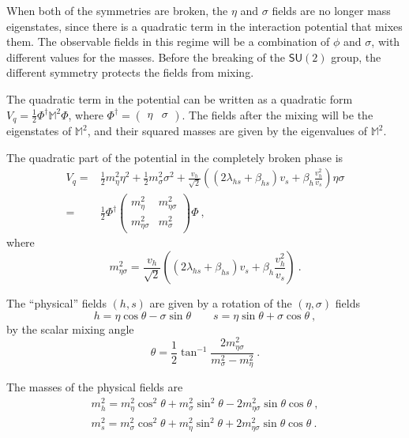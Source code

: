 \documentclass[aps,prd,preprintnumbers,nofootinbibn,twocolumn]{revtex4}
\begin{document}
When both of the symmetries are broken, the $\eta$ and $\sigma$ fields are no longer mass eigenstates, since there is a quadratic term in the interaction potential that mixes them. The observable fields in this regime will be a combination of $\phi$ and $\sigma$, with different values for the masses. Before the breaking of the $\mathsf{SU}(2)$ group, the different symmetry protects the fields from mixing.

The quadratic term in the potential can be written as a quadratic form $V_q = \frac{1}{2}\Phi^\dagger \mathbb{M}^2 \Phi$, where $\Phi^\dagger = \begin{pmatrix}\eta & \sigma \end{pmatrix} $. The fields after the mixing will be the eigenstates of $\mathbb{M}^2$, and their squared masses are given by the eigenvalues of $\mathbb{M}^2$.

The quadratic part of the potential in the completely broken phase is
\begin{align}
V_q =& \frac{1}{2} m_\eta^2 \eta^2  + \frac{1}{2} m_\sigma^2 \sigma^2 + \frac{v_h}{\sqrt{2}} \left((2\lambda_{hs} + \beta_{hs})v_s + \beta_h \frac{v_h^2}{v_s} \right) \eta \sigma \nonumber\\
=& \frac{1}{2} \Phi^\dagger \begin{pmatrix} m_\eta^2 & m_{\eta\sigma}^2\\ m_{\eta\sigma}^2  & m_\sigma^2 \end{pmatrix}\Phi\ ,
\end{align}
where
\begin{equation}
m_{\eta\sigma}^2 = \frac{v_h}{\sqrt{2}} \left((2\lambda_{hs} + \beta_{hs})v_s + \beta_h \frac{v_h^2}{v_s} \right)\ .
\end{equation} 



The ``physical'' fields $(h, s)$ are given by a rotation of the $(\eta, \sigma)$ fields 
\begin{equation}
h = \eta \cos \theta - \sigma \sin \theta \qquad s = \eta \sin \theta + \sigma \cos \theta\ ,
\end{equation}
by the scalar mixing angle 
\begin{equation}
\theta = \frac{1}{2} \tan^{-1} \frac{2m_{\eta\sigma}^2}{m_\sigma^2 - m_\eta^2}\ .
\end{equation}

The masses of the physical fields are
\begin{align}
m_h^2 = m_\eta^2 \cos^2 \theta + m_\sigma^2 \sin^2 \theta - 2 m_{\eta\sigma}^2 \sin \theta \cos \theta\ , \\
m_s^2 = m_\sigma^2 \cos^2 \theta + m_\eta^2 \sin^2 \theta + 2 m_{\eta\sigma}^2 \sin \theta \cos \theta\ .
\end{align}
\end{document}
